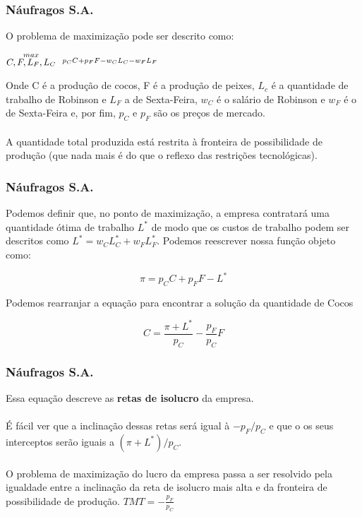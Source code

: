 \documentclass{beamer}[10]
\begin{document}
\begin{frame}
	\frametitle{Náufragos S.A.}

	O problema de maximização pode ser descrito como:

	\begin{center}
		\LARGE $\stackrel{max}{\text{\small $C,F,L_F,L_C$}} \ \ \stackrel{p_C C + p_F F - w_C L_C - w_F L_F}{}$
	\end{center}

	Onde C é a produção de cocos, F é a produção de peixes, $L_c$ é a quantidade de trabalho de Robinson e $L_F$ a de Sexta-Feira, $w_C$ é o salário de Robinson e $w_F$ é o de Sexta-Feira e, por fim, $p_C$ e $p_F$ são os preços de mercado.
	\\~\\
	A quantidade total produzida está restrita à fronteira de possibilidade de produção (que nada mais é do que o reflexo das restrições tecnológicas).

\end{frame}

\begin{frame}
	\frametitle{Náufragos S.A.}

	Podemos definir que, no ponto de maximização, a empresa contratará uma quantidade ótima de trabalho $L^*$ de modo que os custos de trabalho podem ser descritos como $L^* = w_C L^*_C + w_F L^*_F$. Podemos reescrever nossa função objeto como:

	$$ \pi = p_C C + p_F F - L^* $$

	Podemos rearranjar a equação para encontrar a solução da quantidade de Cocos

	$$ C = \frac{\pi + L^*}{p_C} - \frac{p_F}{p_C}F $$

\end{frame}

\begin{frame}
	\frametitle{Náufragos S.A.}

	Essa equação descreve as \textbf{retas de isolucro} da empresa.
	\\~\\
	É fácil ver que a inclinação dessas retas será igual à $-p_F/p_C$ e que o os seus interceptos serão iguais a $(\pi + L^*)/p_C$.
	\\~\\
	O problema de maximização do lucro da empresa passa a ser resolvido pela igualdade entre a inclinação da reta de isolucro mais alta e da fronteira de possibilidade de produção. $ TMT = -\frac{p_F}{p_C} $

\end{frame}
\end{document}
